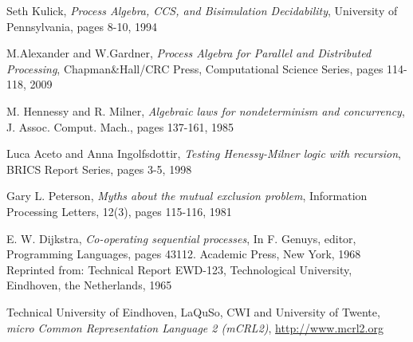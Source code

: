 \begin{thebibliography}{1}
Seth Kulick,
\emph{Process Algebra, CCS, and Bisimulation Decidability},
University of Pennsylvania, pages 8-10, 1994

M.Alexander and W.Gardner,
\emph{Process Algebra for Parallel and Distributed Processing},
Chapman\&Hall/CRC Press, Computational Science Series, pages 114-118, 2009

M. Hennessy and R. Milner,
\emph{Algebraic laws for nondeterminism and concurrency},
J. Assoc. Comput. Mach., pages 137-161, 1985

Luca Aceto and Anna Ingolfsdottir,
\emph{Testing Henessy-Milner logic with recursion},
BRICS Report Series, pages 3-5, 1998

Gary L. Peterson,
\emph{Myths about the mutual exclusion problem}, 
Information Processing Letters, 12(3), pages 115-116, 1981

E. W. Dijkstra,
\emph{Co-operating sequential processes}, 
In F. Genuys, editor, Programming Languages, pages 43112. Academic Press, New York, 1968
Reprinted from: Technical Report EWD-123, Technological University, Eindhoven, the Netherlands, 1965

Technical University of Eindhoven, LaQuSo, CWI and University of Twente,
\emph{micro Common Representation Language 2 (mCRL2)},	
\newline \url{http://www.mcrl2.org}

\end{thebibliography}